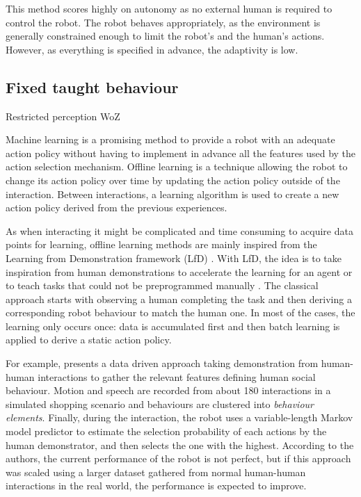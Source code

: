     This method scores highly on autonomy as no external human is required to
    control the robot. The robot behaves appropriately, as the environment is
    generally constrained enough to limit the robot's and the human's actions.
    However, as everything is specified in advance, the adaptivity is low.


\subsection{Fixed taught behaviour}

    Restricted perception WoZ

    Machine  learning is a promising method to provide a robot with an adequate
    action policy without having to implement in advance all the features used
    by the action selection mechanism. Offline learning is a technique allowing
    the robot to change its action policy over time by updating the action
    policy outside of the interaction. Between interactions, a learning
    algorithm is used to create a new action policy derived from the previous
    experiences.

    As when interacting it might be complicated and time consuming to acquire
    data points for learning, offline learning methods are mainly inspired from
    the Learning from Demonstration framework (LfD) \citep{argall2009survey}.
    With LfD, the idea is to take inspiration from human demonstrations to
    accelerate the learning for an agent or to teach tasks that could not be
    preprogrammed manually \citep{billard2013robot}. The classical approach
    starts with observing a human completing the task and then deriving a
    corresponding robot behaviour to match the human one. In most of the cases,
    the learning only occurs once: data is accumulated first and then batch
    learning is applied to derive a static action policy. 

    For example, \citet{liu2014train} presents a data driven approach taking
    demonstration from human-human interactions to gather the relevant features
    defining human social behaviour. Motion and speech are recorded from about
    180 interactions in a simulated shopping scenario and behaviours are
    clustered into \emph{behaviour elements}. Finally, during the interaction,
    the robot uses a variable-length Markov model predictor to estimate the
    selection probability of each actions by the human demonstrator, and then
    selects the one with the highest. According to the authors, the current
    performance of the robot is not perfect, but if this approach was scaled
    using a larger dataset gathered from normal human-human interactions in the
    real world, the performance is expected to improve.


